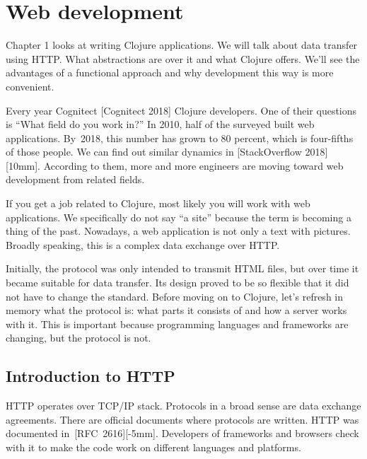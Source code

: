 \chapter{Web development}

\begin{teaser}
Chapter 1 looks at writing Clojure applications. We will talk about data transfer using HTTP. What abstractions are over it and what Clojure offers. We'll see the advantages of a functional approach and why development this way is more convenient.
\end{teaser}


Every year Cognitect [Cognitect 2018] Clojure developers. One of their questions is ``What field do you work in?'' In 2010, half of the surveyed built web applications. By~2018, this number has grown to 80 percent, which is four-fifths of those people. We can find out similar dynamics in [Stack\-Overflow 2018][10mm].
According to them, more and more engineers are moving toward web development from related fields.

If you get a job related to Clojure, most likely you will work with web applications. We specifically do not say ``a site'' because the term is becoming a thing of the past. Nowadays, a web application is not only a text with pictures. Broadly speaking, this is a complex data exchange over HTTP.

Initially, the protocol was only intended to transmit HTML files, but over time it became suitable for data transfer. Its design proved to be so flexible that it did not have to change the standard.  Before moving on to Clojure, let's refresh in memory what the protocol is:
what parts it consists of and how a server works with it. This is important because programming languages and frameworks are changing, but the protocol is not.

\section{Introduction to HTTP}


HTTP operates over TCP/IP stack.  Protocols in a broad sense are data exchange agreements. There are official documents where protocols are written. HTTP was documented in [RFC~2616][-5mm].
Developers of frameworks and browsers check with it to make the code work on different languages and platforms.

